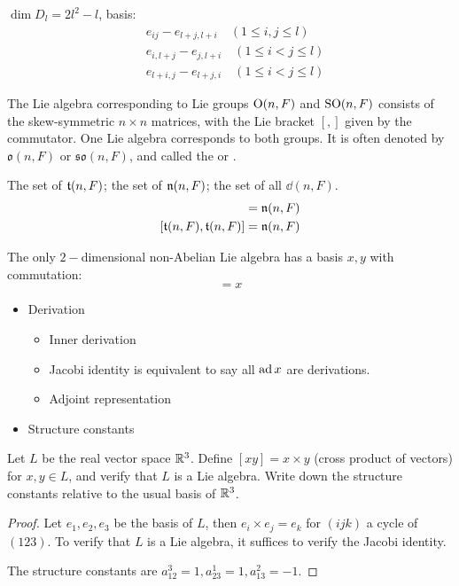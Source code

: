 \begin{exam}[$D_l$]
  $\dim D_l=2l^2-l$, basis:
  \begin{align*}
    & e_{ij}-e_{l+j,l+i} \quad (1\leqslant i,j\leqslant l) \\
    & e_{i,l+j}-e_{j,l+i} \quad (1\leqslant i<j\leqslant l) \\
    & e_{l+i,j}-e_{l+j,i} \quad (1\leqslant i<j\leqslant l)
  \end{align*}
\end{exam}
\begin{rem}
  The Lie algebra corresponding to Lie groups $\GO(n,F)$ and $\SO(n,F)$ consists of the skew-symmetric $n\times n$ matrices, with the Lie bracket $[,]$ given by the commutator. One Lie algebra corresponds to both groups. It is often denoted by $\mathfrak{o}(n, F)$ or $\mathfrak{so}(n, F)$, and called the  or .
\end{rem}

\begin{exam}\label{1.2}
  The set of  $\tt(n,F)$; the set of  $\nn(n,F)$; the set of all  $\dd(n,F)$.
  \begin{align}
    [\dd(n,F),\nn(n,F)]&=\nn(n,F) \\
    [\tt(n,F),\tt(n,F)]&=\nn(n,F)
  \end{align}
\end{exam}

\begin{exam}\label{1.4}
  The only $2-$dimensional non-Abelian Lie algebra has a basis $x,y$ with commutation:
  \begin{equation*}
    [x,y]=x
  \end{equation*}
\end{exam}

\begin{itemize}
  \item Derivation
  \begin{itemize}
    \item Inner derivation
    \item Jacobi identity is equivalent to say all $\ad x$ are derivations.
    \item Adjoint representation
  \end{itemize}
  \item Structure constants
\end{itemize}

\begin{ex}
  Let $L$ be the real vector space $\RR^3$. Define $[x y] = x \times y$ (cross product of vectors) for $x, y \in L$, and verify that $L$ is a Lie algebra. Write down the structure constants relative to the usual basis of $\RR^3$.
\end{ex}
\begin{proof}
  Let $e_1,e_2,e_3$ be the basis of $L$, then $e_i\times e_j=e_k$ for $(ijk)$ a cycle of $(123)$. To verify that $L$ is a Lie algebra, it suffices to verify the Jacobi identity.

  The structure constants are $a_{12}^3=1, a_{23}^1=1, a_{13}^2=-1$.
\end{proof}

